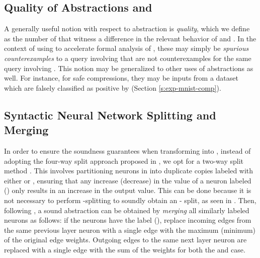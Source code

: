 \subsection{Quality of Abstractions and \gencex}
\label{s:qual}

A generally useful notion with respect to abstraction is \textit{quality},
which we define as the number of \textit{\gencex} that witness a difference in
the relevant behavior of \abs and \cnc. In the context of using \abs to
accelerate formal analysis of \dnn, these \gencex may simply be
\textit{spurious counterexamples} \cite{cegar-nn,cleverest-nn} to a query
involving \abs that are not counterexamples for the same query involving \cnc.
This notion may be generalized to other uses of abstractions as well. For
instance, for safe compressions, they may be inputs from a dataset which
are falsely classified as positive by \abs (Section \ref{s:exp-mnist-comp}).

\subsection{Syntactic Neural Network Splitting and Merging}
\label{s:nn-sam}

In order to ensure the soundness guarantees when transforming \cnc into \abs, 
instead of adopting the four-way split approach proposed in \cite{cegar-nn},
we opt for a two-way split method
\cite{chauhan2022efficiently,liu2022abstraction,10.1145/3644387}. This involves
partitioning neurons in \cnc into duplicate
copies labeled with either {\inc or \dec}, ensuring that any increase 
(decrease) in the value of a neuron labeled \inc (\dec) only results in 
an increase in the output value. This can be done because it is not
necessary to perform \posc-\negc splitting to soundly obtain an \inc-\dec
split, as seen in
\cite{chauhan2022efficiently,liu2022abstraction,10.1145/3644387}. Then,
following \cite{cegar-nn}, a sound 
abstraction can be obtained by \textit{merging} all similarly 
labeled neurons as follows: if the neurons have
the label \inc (\dec), replace incoming edges from the same
previous layer neuron with a single edge with the maximum (minimum) of the
original edge weights. Outgoing edges to the same next layer neuron are replaced
with a single edge with the sum of the weights for both the \inc and \dec case.


